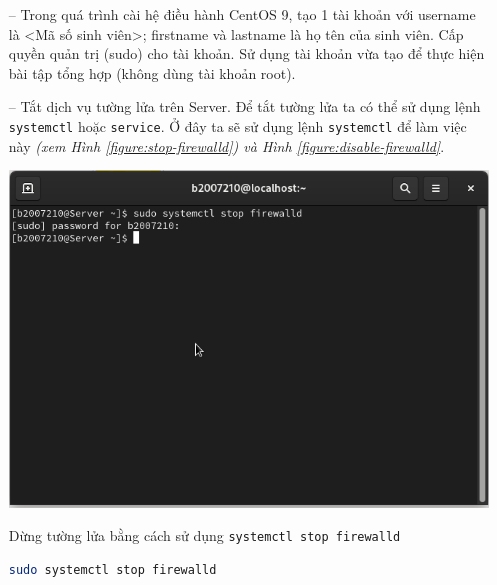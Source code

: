 \documentclass[a4paper, 11pt]{article}
\begin{document}
\begin{itemize}
    \item[--] Trong quá trình cài hệ điều hành CentOS 9, tạo 1 tài khoản với username là <Mã số sinh viên>; firstname và lastname là họ tên của sinh viên. Cấp quyền quản trị (sudo) cho tài khoản. Sử dụng tài khoản vừa tạo để thực hiện bài tập tổng hợp (không dùng tài khoản root).
    \item[--] Tắt dịch vụ tường lửa trên Server. \hfill
          Để tắt tường lửa ta có thể sử dụng lệnh \texttt{systemctl} hoặc \texttt{service}.
          Ở đây ta sẽ sử dụng lệnh \texttt{systemctl} để làm việc này \textit{(xem Hình \ref{figure:stop-firewalld}) và Hình \ref{figure:disable-firewalld}}. \\

          \begin{minipage}
              {\linewidth}
              \captionsetup{type=figure}
              \centering
              \includegraphics[width=\linewidth]{images/stop-firewalld.png}
              \caption{Dừng tường lửa bằng cách sử dụng \texttt{systemctl stop firewalld}}
              \label{figure:stop-firewalld}
          \end{minipage}

          \begin{lstlisting}[language=bash, caption=Dừng tường lửa]
sudo systemctl stop firewalld
\end{lstlisting}


\end{itemize}
\end{document}
